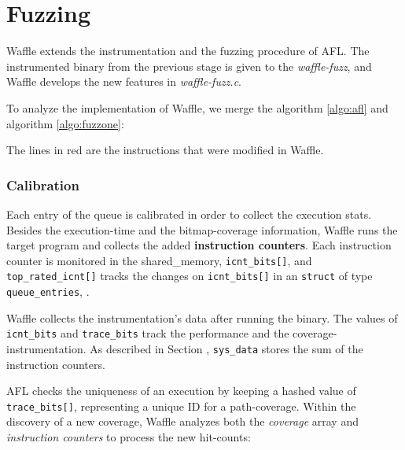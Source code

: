 \section{Fuzzing}
\label{sec:3-afl}
% 

Waffle extends the instrumentation and the fuzzing procedure of AFL. The instrumented binary from the previous stage is given to the \textit{waffle-fuzz}, and Waffle develops the new features in \textit{waffle-fuzz.c}.

To analyze the implementation of Waffle, we merge the algorithm \ref{algo:afl} and algorithm \ref{algo:fuzzone}:



The lines in red are the instructions that were modified in Waffle.

\subsubsection*{Calibration}

Each entry of the queue is calibrated in order to collect the execution stats. Besides the execution-time and the bitmap-coverage information, Waffle runs the target program and collects the added \textbf{instruction counters}. Each instruction counter is monitored in the shared\_memory, \texttt{icnt\_bits[]}, and \texttt{top\_rated\_icnt[]} tracks the changes on \texttt{icnt\_bits[]} in an \texttt{struct} of type \texttt{queue\_entries}, .

Waffle collects the instrumentation's data after running the binary. The values of \texttt{icnt\_bits} and \texttt{trace\_bits} track the performance and the coverage-instrumentation. As described in Section , \texttt{sys\_data} stores the sum of the instruction counters.

AFL checks the uniqueness of an execution by keeping a hashed value of \texttt{trace\_bits[]}, representing a unique ID for a path-coverage. Within the discovery of a new coverage, Waffle analyzes both the \textit{coverage} array and \textit{instruction counters} to process the new hit-counts:

